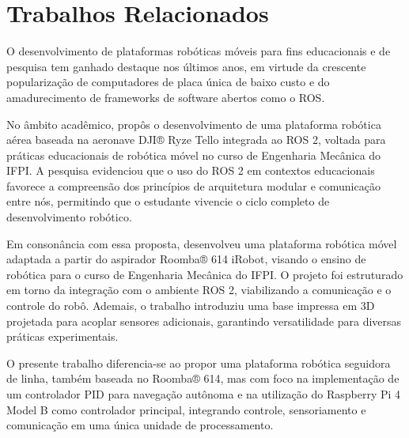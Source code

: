 \chapter{Trabalhos Relacionados}

O desenvolvimento de plataformas robóticas móveis para fins educacionais e de pesquisa tem ganhado destaque nos últimos anos, em virtude da crescente popularização de computadores de placa única de baixo custo e do amadurecimento de frameworks de software abertos como o ROS.

No âmbito acadêmico,  propôs o desenvolvimento de uma plataforma robótica aérea baseada na aeronave DJI® Ryze Tello integrada ao ROS 2, voltada para práticas educacionais de robótica móvel no curso de Engenharia Mecânica do IFPI. A pesquisa evidenciou que o uso do ROS 2 em contextos educacionais favorece a compreensão dos princípios de arquitetura modular e comunicação entre nós, permitindo que o estudante vivencie o ciclo completo de desenvolvimento robótico.

Em consonância com essa proposta,  desenvolveu uma plataforma robótica móvel adaptada a partir do aspirador Roomba® 614 iRobot, visando o ensino de robótica para o curso de Engenharia Mecânica do IFPI. O projeto foi estruturado em torno da integração com o ambiente ROS 2, viabilizando a comunicação e o controle do robô. Ademais, o trabalho introduziu uma base impressa em 3D projetada para acoplar sensores adicionais, garantindo versatilidade para diversas práticas experimentais.

O presente trabalho diferencia-se ao propor uma plataforma robótica seguidora de linha, também baseada no Roomba® 614, mas com foco na implementação de um controlador PID para navegação autônoma e na utilização do Raspberry Pi 4 Model B como controlador principal, integrando controle, sensoriamento e comunicação em uma única unidade de processamento.
